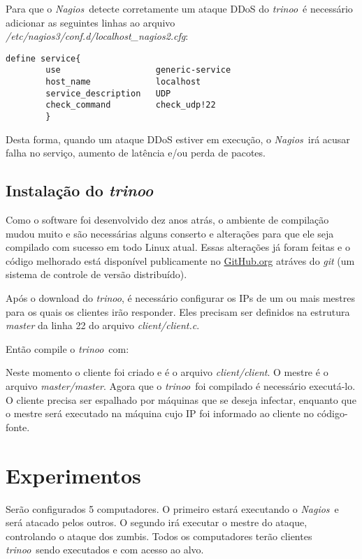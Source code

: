 \documentclass[10pt,a4paper]{article}
\newcommand{\Nagios}{\textit{Nagios}}
\newcommand{\trinoo}{\textit{trinoo}}
\newcommand{\cbox}[1]
{
	\setlength\fboxrule{1pt}
	\begin{alltt}\fbox{#1}\end{alltt}
	\setlength\fboxrule{0.5pt}
}
\begin{document}
Para que o \Nagios\ detecte corretamente um ataque DDoS do \trinoo\ é necessário adicionar as
seguintes linhas ao arquivo \emph{/etc/nagios3/conf.d/localhost\_nagios2.cfg}:

\begin{verbatim}
define service{
        use                   generic-service
        host_name             localhost
        service_description   UDP
        check_command         check_udp!22
        }
\end{verbatim}

Desta forma, quando um ataque DDoS estiver em execução, o \Nagios\ irá acusar falha no serviço,
aumento de latência e/ou perda de pacotes.


\subsection{Instalação do \trinoo}

Como o software foi desenvolvido dez anos atrás, o ambiente de compilação mudou muito e são
necessárias alguns conserto e alterações para que ele seja compilado com sucesso em todo Linux
atual. Essas alterações já foram feitas e o código melhorado está disponível publicamente no
\href{git://github.com/tureba/trinoo.git}{GitHub.org} atráves do \emph{git} (um sistema de
controle de versão distribuído).

Após o download do \trinoo, é necessário configurar os IPs de um ou mais mestres para os quais
os clientes irão responder. Eles precisam ser definidos na estrutura \emph{master} da linha 22
do arquivo \emph{client/client.c}.

Então compile o \trinoo\ com:

\cbox{\$\ make -s}

Neste momento o cliente foi criado e é o arquivo \emph{client/client}. O mestre é o arquivo
\emph{master/master}. Agora que o \trinoo\ foi compilado é necessário executá-lo. O cliente
precisa ser espalhado por máquinas que se deseja infectar, enquanto que o mestre será executado
na máquina cujo IP foi informado ao cliente no código-fonte.


\section{Experimentos}\label{sec:experimentos}

Serão configurados 5 computadores. O primeiro estará executando o \Nagios\ e será atacado pelos
outros. O segundo irá executar o mestre do ataque, controlando o ataque dos zumbis. Todos os
computadores terão clientes \trinoo\ sendo executados e com acesso ao alvo.
\end{document}
